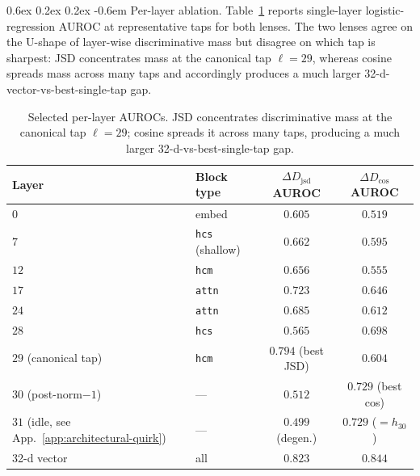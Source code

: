 \documentclass{article}
\makeatletter
\renewcommand\paragraph{\@startsection{paragraph}{4}{\z@}%
  {0.6ex \@plus 0.2ex \@minus 0.2ex}%
  {-0.6em}%
{\normalfont\normalsize\bfseries}}
\theoremstyle{plain}
\theoremstyle{definition}
\theoremstyle{remark}
\newcommand{\DDcos}{\Delta D_{\cos}}
\newcommand{\DDjsd}{\Delta D_{\mathrm{jsd}}}
\makeatother
\begin{document}
\paragraph{Per-layer ablation.} Table~\ref{tab:per-layer} reports
single-layer logistic-regression AUROC at representative taps for both
lenses. The two lenses agree on the U-shape of layer-wise discriminative
mass but disagree on which tap is sharpest: JSD concentrates mass at the
canonical tap $\ell\!=\!29$, whereas cosine spreads mass across many
taps and accordingly produces a much larger 32-d-vector-vs-best-single-tap
gap.

\begin{table}[!htbp]
  \caption{Selected per-layer AUROCs. JSD concentrates discriminative
    mass at the canonical tap $\ell\!=\!29$; cosine spreads it across many
  taps, producing a much larger 32-d-vs-best-single-tap gap.}
  \label{tab:per-layer}
  \centering
  \small
  \begin{tabular}{@{}llcc@{}}
    \toprule
    Layer & Block type & $\DDjsd$ AUROC & $\DDcos$ AUROC \\
    \midrule
    $0$  & embed                    & $0.605$ & $0.519$ \\
    $7$  & \texttt{hcs} (shallow)   & $0.662$ & $0.595$ \\
    $12$ & \texttt{hcm}             & $0.656$ & $0.555$ \\
    $17$ & \texttt{attn}            & $0.723$ & $0.646$ \\
    $24$ & \texttt{attn}            & $0.685$ & $0.612$ \\
    $28$ & \texttt{hcs}             & $0.565$ & $0.698$ \\
    $29$ (canonical tap) & \texttt{hcm}
    & $\mathbf{0.794}$ (best JSD) & $0.604$ \\
    $30$ (post-norm$-1$)  & ---     & $0.512$ & $\mathbf{0.729}$ (best cos) \\
    $31$ (idle, see App.~\ref{app:architectural-quirk}) & ---
    & $0.499$ (degen.) & $0.729$ ($=h_{30}$) \\
    \midrule
    32-d vector & all                 & $0.823$ & $0.844$ \\
    \bottomrule
  \end{tabular}
\end{table}
\end{document}
